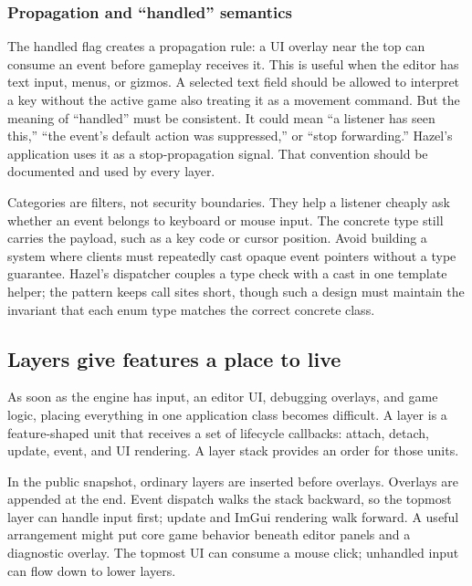 \subsubsection{Propagation and ``handled'' semantics}\label{05-engine-i-ch013-propagation-and-handled-semantics}

The handled flag creates a propagation rule: a UI overlay near the top can consume an event before gameplay receives it. This is useful when the editor has text input, menus, or gizmos. A selected text field should be allowed to interpret a key without the active game also treating it as a movement command. But the meaning of ``handled'' must be consistent. It could mean ``a listener has seen this,'' ``the event's default action was suppressed,'' or ``stop forwarding.'' Hazel's application uses it as a stop-propagation signal. That convention should be documented and used by every layer.

Categories are filters, not security boundaries. They help a listener cheaply ask whether an event belongs to keyboard or mouse input. The concrete type still carries the payload, such as a key code or cursor position. Avoid building a system where clients must repeatedly cast opaque event pointers without a type guarantee. Hazel's dispatcher couples a type check with a cast in one template helper; the pattern keeps call sites short, though such a design must maintain the invariant that each enum type matches the correct concrete class.

\subsection{Layers give features a place to live}\label{05-engine-i-ch013-layers-give-features-a-place-to-live}

As soon as the engine has input, an editor UI, debugging overlays, and game logic, placing everything in one application class becomes difficult. A layer is a feature-shaped unit that receives a set of lifecycle callbacks: attach, detach, update, event, and UI rendering. A layer stack provides an order for those units.

In the public snapshot, ordinary layers are inserted before overlays. Overlays are appended at the end. Event dispatch walks the stack backward, so the topmost layer can handle input first; update and ImGui rendering walk forward. A useful arrangement might put core game behavior beneath editor panels and a diagnostic overlay. The topmost UI can consume a mouse click; unhandled input can flow down to lower layers.

